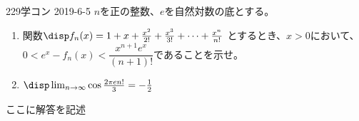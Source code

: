 \begin{thm}{229}{}{学コン 2019-6-5}
 $n$を正の整数、$e$を自然対数の底とする。
 \begin{enumerate}
  \item 関数$\disp f_n(x)=1+x+\frac{x^2}{2!}+\frac{x^3}{3!}+\dots +\frac{x^n}{n!}$ とするとき、$x>0$において、$0<e^x-f_n(x)<\dfrac{x^{n+1}e^x}{(n+1)!}$であることを示せ。
  \item $\disp \lim_{n\to\infty} \cos\frac{2\pi e n!}{3}=-\frac{1}{2}$
 \end{enumerate}
\end{thm}

ここに解答を記述